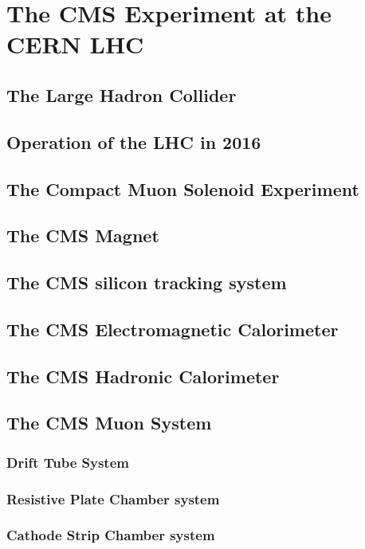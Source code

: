 \chapter{The CMS Experiment at the CERN LHC}
\section{The Large Hadron Collider}
\section{Operation of the LHC in 2016}
\section{The Compact Muon Solenoid Experiment}
\section{The CMS Magnet}
\section{The CMS silicon tracking system}
\section{The CMS Electromagnetic Calorimeter}
\section{The CMS Hadronic Calorimeter}
\section{The CMS Muon System}
\subsection{Drift Tube System}
\subsection{Resistive Plate Chamber system}
\subsection{Cathode Strip Chamber system}

